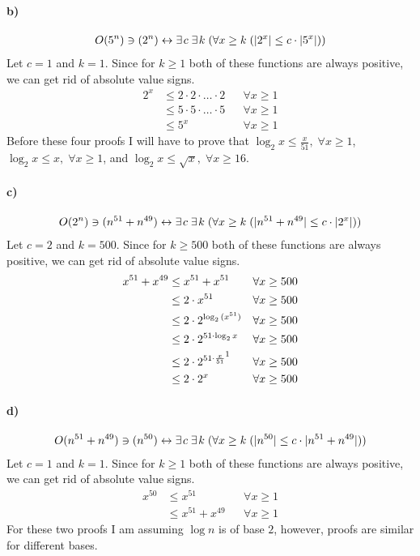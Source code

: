 \documentclass[12pt]{article}
\newcommand\+{\mkern2mu}
\begin{document}
\paragraph{b)} %
\begin{gather*}
O(5^n) \ni (2^n) \leftrightarrow \exists \+ c \; \exists \+ k \; (\forall x \geq k \; (\vert 2^x \vert \leq c \cdot \vert 5^x \vert))
\end{gather*}
Let $c = 1$ and $k = 1$.
Since for $k \geq 1$ both of these functions are always positive, we can get rid of absolute value signs.
\begin{align*}
2^x &\leq 2 \cdot 2 \cdot \dotso \cdot 2 && \forall x \geq 1 \\
&\leq 5 \cdot 5 \cdot \dotso \cdot 5 && \forall x \geq 1 \\
&\leq 5^x && \forall x \geq 1
\end{align*}
Before these four proofs I will have to prove that $\log_2{x} \leq \frac{x}{51}, \; \forall x \geq 1$, $\log_2{x} \leq x, \; \forall x \geq 1$, and $\log_2{x} \leq \sqrt{x}, \; \forall x \geq 16$.
\paragraph{c)}
\begin{gather*}
O(2^n) \ni (n^{51}+n^{49}) \leftrightarrow \exists \+ c \; \exists \+ k \; (\forall x \geq k \; (\vert n^{51}+n^{49} \vert \leq c \cdot \vert 2^x \vert))
\end{gather*}
Let $c = 2$ and $k = 500$.
Since for $k \geq 500$ both of these functions are always positive, we can get rid of absolute value signs.
\begin{align*}
x^{51}+x^{49} &\leq x^{51}+x^{51} && \forall x \geq 500 \\
&\leq 2 \cdot x^{51} && \forall x \geq 500 \\
&\leq 2 \cdot 2^{\log_2{(x^{51})}} && \forall x \geq 500 \\
&\leq 2 \cdot 2^{51 \cdot \log_2{x}} && \forall x \geq 500 \\
&\leq 2 \cdot 2^{51 \cdot \frac{x}{51}\footnotemark} && \forall x \geq 500 \\
&\leq 2 \cdot 2^{x} && \forall x \geq 500
\end{align*}
\paragraph{d)}
\begin{gather*}
O(n^{51}+n^{49}) \ni (n^{50}) \leftrightarrow \exists \+ c \; \exists \+ k \; (\forall x \geq k \; (\vert n^{50} \vert \leq c \cdot \vert n^{51}+n^{49} \vert))
\end{gather*}
Let $c = 1$ and $k = 1$.
Since for $k \geq 1$ both of these functions are always positive, we can get rid of absolute value signs.
\begin{align*}
x^{50} &\leq x^{51} && \forall x \geq 1 \\
&\leq x^{51}+x^{49} && \forall x \geq 1
\end{align*}
For these two proofs I am assuming $\log{n}$ is of base $2$, however, proofs are similar for different bases.
\end{document}
